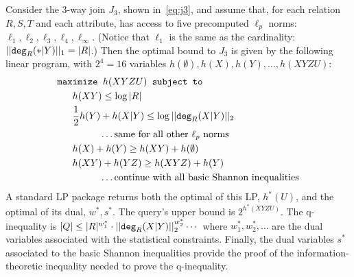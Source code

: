 \begin{example} Consider the 3-way join $J_3$, shown
  in~\eqref{eq:j3}, and assume that, for each relation $R, S, T$
  and each attribute, \system has access to five precomputed $\ell_p$
  norms: $\ell_1, \ell_2, \ell_3, \ell_4, \ell_\infty$.  (Notice that
  $\ell_1$ is the same as the cardinality:
  $||\texttt{deg}_R(*|Y)||_1=|R|$.)  Then the optimal bound to $J_3$ is
  given by the following \lpbase linear program, with $2^4=16$ variables
  $h(\emptyset), h(X), h(Y), \ldots, h(XYZU)$:
%
  \begin{align*}
    \texttt{max}&\texttt{imize } h(XYZU) \texttt{ subject to} \\
              & h(XY) \leq \log |R| \\
              & \frac{1}{2}h(Y)+h(X|Y) \leq \log\lp{\degree_R(X|Y)}_2\\
              & \hspace{10mm} \ldots \text{same for all other $\ell_p$ norms}\\
              & h(X)+h(Y)\geq h(XY)+h(\emptyset)\\
              & h(XY)+h(YZ) \geq h(XYZ)+h(Y)\\
              & \hspace{10mm} \ldots \text{continue with all basic Shannon inequalities}
  \end{align*}
%
  A standard LP package returns both the optimal of this LP, $h^*(U)$,
  and the optimal of its dual, $w^*,s^*$.  The query's upper bound is
  $2^{h^*(XYZU)}$.  The q-inequality is
  $|Q| \leq |R|^{w_1^*} \cdot ||\texttt{deg}_R(X|Y)||_2^{w_2^*} \cdots$
  where $w_1^*, w_2^*, \ldots$ are the dual variables associated with
  the statistical constraints.  Finally, the dual variables $s^*$
  associated to the basic Shannon inequalities provide the proof of
  the information-theoretic inequality needed to prove the
  q-inequality.
\end{example}



